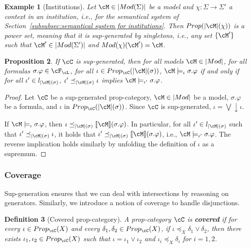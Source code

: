 \documentclass[preprint,3p,times]{elsarticle}
\newtheorem{definition}{Definition}[section]
\newtheorem{proposition}[definition]{Proposition}
\newtheorem{example}[definition]{Example}
\def\sem#1{[\![ #1 ] \!]}
\begin{document}
\begin{example}[Institutions]
Let \(\cM \in |Mod(\Sigma)|\) be a model and \(\chi : \Sigma \to \Sigma'\) a context in an institution, i.e., for the semantical system of Section~\ref{subsubsec:semantical system for institutions}. Then $Prop(|\cM|(\chi))$ is a power set, meaning that it is sup-generated by singletons, i.e., any set $\{\cM'\}$ such that $\cM' \in |Mod(\Sigma')|$ and $Mod(\chi)(\cM') = \cM$.  
\end{example}

\begin{proposition}
    If $\cC$ is sup-generated, then for all models \(\cM \in |Mod|\), for all formulas \(\sigma.\varphi \in \cF_\cL\), for all \(\iota \in Prop_\cC(|\cM|(\sigma))\), \(\cM \models_\iota \sigma.\varphi\) if and only if for all \(\iota' \in l_{|\cM|(\sigma)}\), \(\iota' \preceq_{|\cM|(\sigma)} \iota\) implies \(\cM \models_{\iota'} \sigma.\varphi\).
\end{proposition}

\begin{proof}
    Let \(\cC\) be a sup-generated prop-category, \(\cM \in |Mod|\) be a model, \(\sigma.\varphi\) be a formula, and \(\iota\) in \(Prop_\cC(|\cM|(\sigma))\).
    Since \(\cC\) is sup-generated, \(\iota = \bigvee \downarrow\!\iota\).

    If \(\cM \models_\iota \sigma.\varphi\), then \(\iota \preceq_{|\cM|(\sigma)} \sem{\cM}(\sigma.\varphi)\). In particular, for all \(\iota' \in l_{|\cM|(\sigma)}\) such that \(\iota' \preceq_{|\cM|(\sigma)} \iota\), it holds that \(\iota' \preceq_{|\cM|(\sigma)} \sem{\cM}(\sigma.\varphi)\), i.e., \(\cM \models_{\iota'} \sigma.\varphi\).
    The reverse implication holds similarly by unfolding the definition of \(\iota\) as a supremum.
\end{proof}

\subsubsection{Coverage}

Sup-generation ensures that we can deal with intersections by reasoning on generators. Similarly, we introduce a notion of coverage to handle disjunctions.

\begin{definition}[Covered prop-category]
    A prop-category $\cC$ is {\bf covered} if for every $\iota \in Prop_\cC(X)$ and every $\delta_1,\delta_2 \in Prop_\cC(X)$, if $\iota \preceq_X \delta_1 \vee \delta_2$, then there exists $\iota_1,\iota_2 \in Prop_\cC(X)$ such that $\iota = \iota_1 \vee \iota_2$ and $\iota_i \preceq_X \delta_i$ for \(i=1,2\).
\end{definition}
\end{document}
